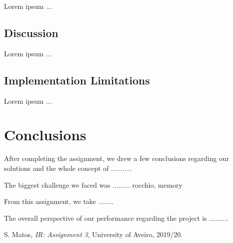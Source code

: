 \documentclass[12pt]{article}
\begin{document}
Lorem ipsum ...

\subsection{Discussion}\label{discussion}

Lorem ipsum ...

\subsection{Implementation Limitations}

Lorem ipsum ...

\section{Conclusions}

After completing the assignment, we drew a few conclusions regarding our
solutions and the whole concept of ...........

The biggest challenge we faced was ......... rocchio, memory

From this assignment, we take ........

The overall perspective of our performance regarding the project is ..........

\begin{thebibliography}{9}
  

    S. Matos,
    \textit{IR: Assignment 3},
    University of Aveiro,
    2019/20.
  
\end{thebibliography}

\clearpage
\end{document}
